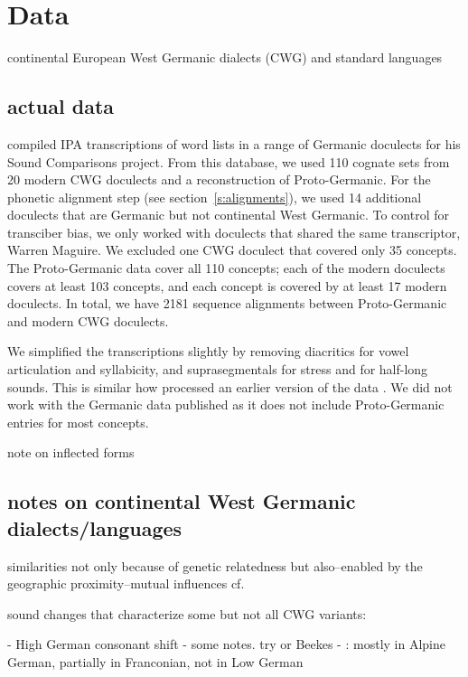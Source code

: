 \documentclass{article}
\begin{document}
\section{Data}

continental European West Germanic dialects (CWG) and standard languages

\subsection{actual data}

\citet{heggarty2018sound} compiled IPA transcriptions of word lists in a range of Germanic doculects for his Sound Comparisons project.
From this database, we used 110 cognate sets from 20 modern CWG doculects and a reconstruction of Proto-Germanic.
For the phonetic alignment step (see section~\ref{s:alignments}), we used 14 additional doculects that are Germanic but not continental West Germanic. 
To control for transciber bias, we only worked with doculects that shared the same transcriptor, Warren Maguire.
We excluded one CWG doculect that covered only 35 concepts. %
The Proto-Germanic data cover all 110 concepts; each of the modern doculects covers at least 103 concepts, and each concept is covered by at least 17 modern doculects.
In total, we have 2181 sequence alignments between Proto-Germanic and modern CWG doculects.

We simplified the transcriptions slightly by removing diacritics for vowel articulation and syllabicity, and suprasegmentals for stress and for half-long sounds.
This is similar how \citet{list2014benchmark} processed an earlier version of the data \citep{renfrew2009languages}.
We did not work with the Germanic data \citeauthor{list2014benchmark} published as it does not include Proto-Germanic entries for most concepts.

note on inflected forms

\subsection{notes on continental West Germanic dialects/languages}

similarities not only because of genetic relatedness but also--enabled by the geographic proximity--mutual influences
cf. \citet[p. 8]{harbert2007germanic}


sound changes that characterize some but not all CWG variants:

- High German consonant shift
  - some notes. try \citet[pp. 47-48]{harbert2007germanic} or Beekes
  - \citet[p. 15]{harbert2007germanic}: mostly in Alpine German, partially in Franconian, not in Low German
\end{document}
